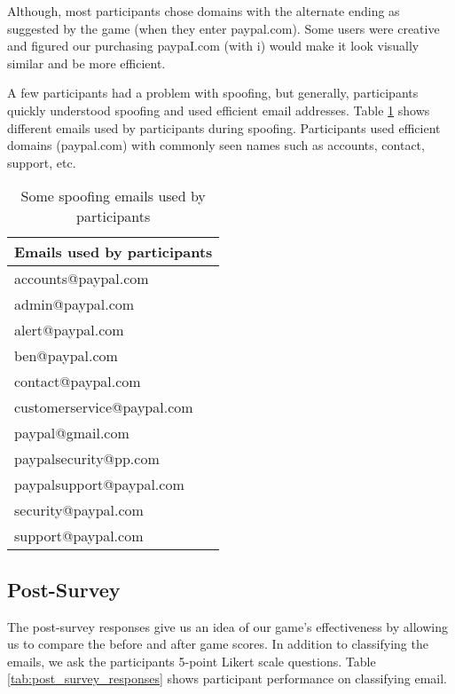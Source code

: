 Although, most participants chose domains with the alternate ending as suggested by the game (when they enter paypal.com). Some users were creative and figured our purchasing paypaI.com (with i) would make it look visually similar and be more efficient.

A few participants had a problem with spoofing, but generally, participants quickly understood spoofing and used efficient email addresses. Table \ref{tab:spoofing_emails} shows different emails used by participants during spoofing. Participants used efficient domains (paypal.com) with commonly seen names such as accounts, contact, support, etc.

\begin{table}
    \centering
    \begin{tabular}{l}
        \hline
        \textbf{Emails used by participants} \\
        \hline
        accounts@paypal.com                  \\
        admin@paypal.com                     \\
        alert@paypal.com                     \\
        ben@paypal.com                       \\
        contact@paypal.com                   \\
        customerservice@paypal.com           \\
        paypal@gmail.com                     \\
        paypalsecurity@pp.com                \\
        paypalsupport@paypal.com             \\
        security@paypal.com                  \\
        support@paypal.com                   \\
        \hline
    \end{tabular}
    \caption{Some spoofing emails used by participants}
    \label{tab:spoofing_emails}
\end{table}

\subsection{Post-Survey}
The post-survey responses give us an idea of our game's effectiveness by allowing us to compare the before and after game scores. In addition to classifying the emails, we ask the participants 5-point Likert scale questions. Table \ref{tab:post_survey_responses} shows participant performance on classifying email.

